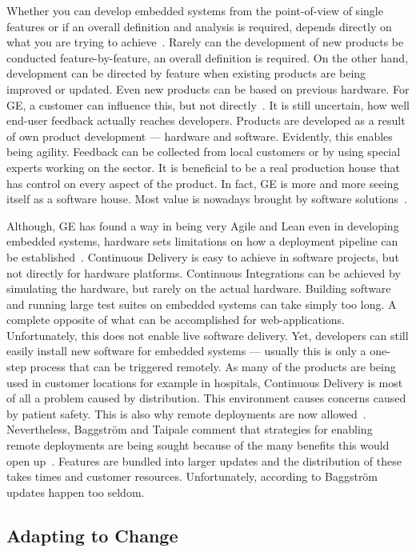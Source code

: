 \documentclass[english]{tktltiki2}
\begin{document}
Whether you can develop embedded systems from the point-of-view of single features or if an overall definition and analysis is required, depends directly on what you are trying to achieve~\cite{BT15}. Rarely can the development of new products be conducted feature-by-feature, an overall definition is required. On the other hand, development can be directed by feature when existing products are being improved or updated. Even new products can be based on previous hardware. For GE, a customer can influence this, but not directly~\cite{BT15}. It is still uncertain, how well end-user feedback actually reaches developers. Products are developed as a result of own product development — hardware and software. Evidently, this enables being agility. Feedback can be collected from local customers or by using special experts working on the sector. It is beneficial to be a real production house that has control on every aspect of the product. In fact, GE is more and more seeing itself as a software house. Most value is nowadays brought by software solutions~\cite{BT15}.

Although, GE has found a way in being very Agile and Lean even in developing embedded systems, hardware sets limitations on how a deployment pipeline can be established~\cite{BT15}. Continuous Delivery is easy to achieve in software projects, but not directly for hardware platforms. Continuous Integrations can be achieved by simulating the hardware, but rarely on the actual hardware. Building software and running large test suites on embedded systems can take simply too long. A complete opposite of what can be accomplished for web-applications. Unfortunately, this does not enable live software delivery. Yet, developers can still easily install new software for embedded systems — usually this is only a one-step process that can be triggered remotely. As many of the products are being used in customer locations for example in hospitals, Continuous Delivery is most of all a problem caused by distribution. This environment causes concerns caused by patient safety. This is also why remote deployments are now allowed~\cite{BT15}. Nevertheless, Baggström and Taipale comment that strategies for enabling remote deployments are being sought because of the many benefits this would open up~\cite{BT15}. Features are bundled into larger updates and the distribution of these takes times and customer resources. Unfortunately, according to Baggström updates happen too seldom.

\subsection{Adapting to Change}
\end{document}
